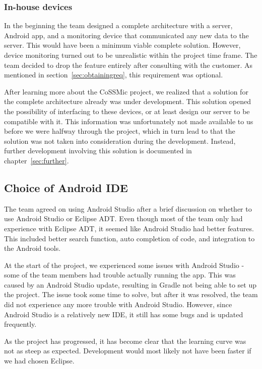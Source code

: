 \subsubsection{In-house devices}
In the beginning the team designed a complete architecture with a server, Android app, and a monitoring device that communicated any new data to the server. This would have been a minimum viable complete solution. However, device monitoring turned out to be unrealistic within the project time frame. The team decided to drop the feature entirely after consulting with the customer. As mentioned in section~\ref{sec:obtainingreq}, this requirement was optional.

After learning more about the CoSSMic project, we realized that a solution for the complete architecture already was under development. This solution opened the possibility of interfacing to these devices, or at least design our server to be compatible with it. This information was unfortunately not made available to us before we were halfway through the project, which in turn lead to that the solution was not taken into consideration during the development. Instead, further development involving this solution is documented in chapter~\ref{sec:further}.

\subsection{Choice of Android IDE}
The team agreed on using Android Studio after a brief discussion on whether to use Android Studio or Eclipse ADT. Even though most of the team only had experience with Eclipse ADT, it seemed like Android Studio had better features. This included  better search function, auto completion of code, and integration to the Android tools.
 
At the start of the project, we experienced some issues with Android Studio - some of the team members had trouble actually running the app. This was caused by an Android Studio update, resulting in Gradle not being able to set up the project. The issue took some time to solve, but after it was resolved, the team did not experience any more trouble with Android Studio. However, since Android Studio is a relatively new IDE, it still has some bugs and is updated frequently.

As the project has progressed, it has become clear that the learning curve was not as steep as expected. Development would most likely not have been faster if we had chosen Eclipse.

